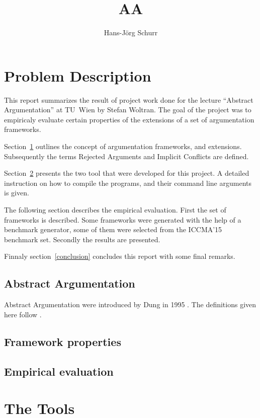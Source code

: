 \documentclass{scrartcl}
\title{AA}
\author{Hans-Jörg Schurr}
\begin{document}
\maketitle
\tableofcontents

\section{Problem Description}
\label{problemdesc}
This report summarizes the result of project work done for the lecture ``Abstract Argumentation'' at TU~Wien by
Stefan Woltran. The goal of the project was to empiricaly evaluate certain properties of the extensions of a set
of argumentation frameworks.

Section~\ref{problemdesc} outlines the concept of argumentation frameworks, and extensions. Subsequently
the terms Rejected Arguments and Implicit Conflicts are defined.

Section~\ref{tools} presents the two tool that
were developed for this project. A detailed instruction on how to compile the programs, and their
command line arguments is given.

The following section describes the empirical evaluation. First the set of frameworks is described.
Some frameworks were generated with the help of a benchmark generator, some of them were selected
from the ICCMA'15 benchmark set. Secondly the results are presented.

Finnaly section~\ref{conclusion} concludes this report with some final remarks.

\subsection{Abstract Argumentation}

Abstract Argumentation were introduced by Dung in 1995 \cite{dung95}. The definitions given
here follow \cite{linsbichler2015hidden}. 

\subsection{Framework properties}
\subsection{Empirical evaluation}

\section{The Tools}
\label{tools}
\end{document}

